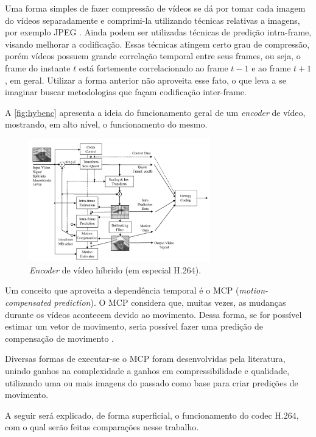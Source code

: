 \documentclass[cic,tc]{iiufrgs}
\begin{document}
Uma forma simples de fazer compressão de vídeos se dá por tomar cada imagem do vídeos
separadamente e comprimi-la utilizando técnicas relativas a imagens, por exemplo JPEG \cite{SullivanH264}.
Ainda podem ser utilizadas técnicas de predição intra-frame, visando melhorar a codificação.
Essas técnicas atingem certo grau de compressão, porém vídeos possuem grande correlação temporal
entre seus frames, ou seja, o frame do instante $t$ está fortemente correlacionado ao frame $t-1$ e
ao frame $t+1$, em geral.
Utilizar a forma anterior não aproveita esse fato, o que leva a se imaginar buscar metodologias
que façam codificação inter-frame.

A \autoref{fig:hybenc} apresenta a ideia do funcionamento geral de um \textit{encoder} de vídeo,
mostrando, em alto nível, o funcionamento do mesmo.
\begin{figure}[H]
    \label{fig:hybenc}
    \caption{\textit{Encoder} de vídeo híbrido (em especial H.264).}
    \begin{center}
        \includegraphics[width=0.7\textwidth]{img/HybridCodec.png}
    \end{center}
\end{figure}

Um conceito que aproveita a dependência temporal é o MCP (\textit{motion-compensated prediction}).
O MCP considera que, muitas vezes, as mudanças durante os vídeos acontecem devido ao movimento.
Dessa forma, se for possível estimar um vetor de movimento, seria possível fazer uma predição
de compensação de movimento \cite{SullivanH264}. 

Diversas formas de executar-se o MCP foram desenvolvidas pela literatura, unindo ganhos
na complexidade a ganhos em compressibilidade e qualidade, utilizando uma ou mais imagens 
do passado como base para criar predições de movimento.

A seguir será explicado, de forma superficial, o funcionamento do codec H.264, com o qual 
serão feitas comparações nesse trabalho.
\end{document}
